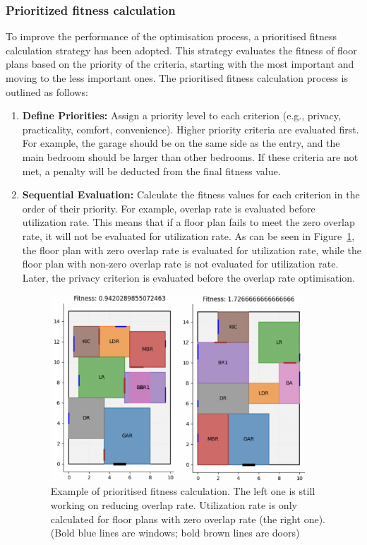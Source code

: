 \documentclass[]{article}
\begin{document}
\subsubsection{Prioritized fitness calculation}
To improve the performance of the optimisation process, a prioritised fitness calculation strategy has been adopted. This strategy evaluates the fitness of floor plans based on the priority of the criteria, starting with the most important and moving to the less important ones. The prioritised fitness calculation process is outlined as follows:

\begin{enumerate}
    \item \textbf{Define Priorities:} Assign a priority level to each criterion (e.g., privacy, practicality, comfort, convenience). Higher priority criteria are evaluated first. For example, the garage should be on the same side as the entry, and the main bedroom should be larger than other bedrooms. If these criteria are not met, a penalty will be deducted from the final fitness value.
    \item \textbf{Sequential Evaluation:} Calculate the fitness values for each criterion in the order of their priority. For example, overlap rate is evaluated before utilization rate. This means that if a floor plan fails to meet the zero overlap rate, it will not be evaluated for utilization rate. As can be seen in Figure~\ref{fig:prioritized-fitness}, the floor plan with zero overlap rate is evaluated for utilization rate, while the floor plan with non-zero overlap rate is not evaluated for utilization rate. Later, the privacy criterion is evaluated before the overlap rate optimisation.
          \begin{figure}[h]
              \centering
              \includegraphics[width=0.9\textwidth]{images/prioritized-fitness.png}
              \caption{Example of prioritised fitness calculation. The left one is still working on reducing overlap rate. Utilization rate is only calculated for floor plans with zero overlap rate (the right one). (Bold blue lines are windows; bold brown lines are doors)}
              \label{fig:prioritized-fitness}
          \end{figure}


\end{enumerate}
\end{document}
